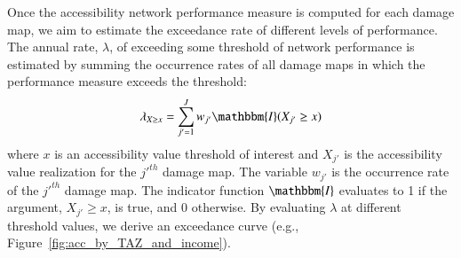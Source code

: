 

Once the accessibility network performance measure is computed for each damage map, we aim to estimate the exceedance rate of different levels of performance. The annual rate, $\lambda$, of exceeding some threshold of network performance is estimated by summing the occurrence rates of all damage maps in which the performance measure exceeds the threshold: 
\begin{equation}
\lambda_{X \geq x} = \sum_{j'=1}^{J} w_{j'} \mathbbm{I}(X_{j'}\geq x)
\label{eq:exceedance}
\end{equation}
where $x$ is an accessibility value threshold of interest and $X_{j'}$ is the accessibility value realization for the $j'^{th}$ damage map. The variable $w_{j'}$ is the occurrence rate of the $j'^{th}$ damage map.%
The indicator function $\mathbbm{I}$  evaluates to 1 if the argument, $X_{j'} \geq x$, is true, and 0 otherwise. By evaluating $\lambda$ at different threshold values, we derive an exceedance curve (e.g., Figure~\ref{fig:acc_by_TAZ_and_income}). 

